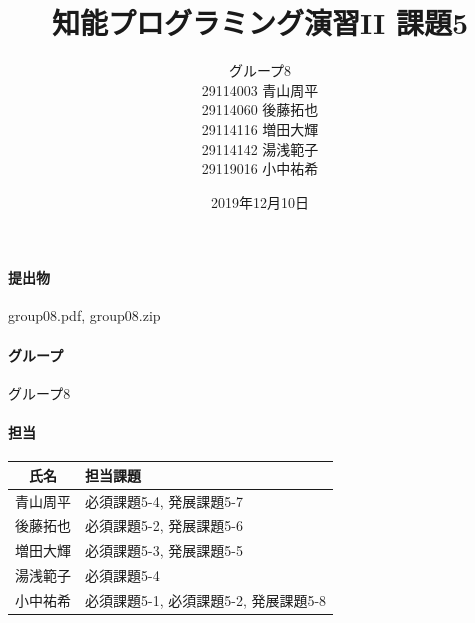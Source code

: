 \documentclass[uplatex,12pt]{jsarticle}
\title{知能プログラミング演習II 課題5}
\author{グループ8\\
  29114003 青山周平\\
  29114060 後藤拓也\\
  29114116 増田大輝\\
  29114142 湯浅範子\\
  29119016 小中祐希\\
}
\date{2019年12月10日}
\begin{document}
\maketitle

\paragraph{提出物} group08.pdf, group08.zip
\paragraph{グループ} グループ8

\paragraph{担当}
\begin{tabular}{|c|l|}
  \hline
  氏名&担当課題\\
  \hline\hline
  青山周平&必須課題5-4, 発展課題5-7\\
  \hline
  後藤拓也&必須課題5-2, 発展課題5-6\\
  \hline
  増田大輝&必須課題5-3, 発展課題5-5\\
  \hline
  湯浅範子&必須課題5-4\\
  \hline
  小中祐希&必須課題5-1, 必須課題5-2, 発展課題5-8\\
  \hline
\end{tabular}
\end{document}
